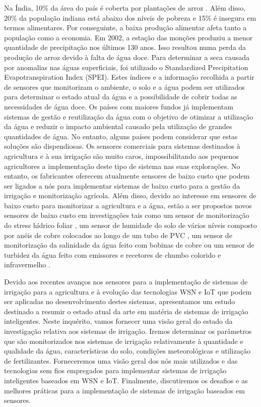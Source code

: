 \documentclass[conference]{IEEEtran}
\begin{document}
Na Índia, 10\% da área do país é coberta por plantações de arroz \cite{zampieri2018surface}. 
Além disso, 20\% da população indiana está 
abaixo dos níveis de pobreza e 15\% é insegura em termos alimentares. 
Por conseguinte, a baixa produção alimentar afeta tanto a população como a economia. 
Em 2002, a estação das monções produziu a menor quantidade de precipitação nos 
últimos 130 anos. Isso resultou numa perda da produção de arroz devido à falta 
de água doce. Para determinar a seca causada por anomalias nas águas superficiais, 
foi utilizado o Standardized Precipitation Evapotranspiration Index (SPEI). 
Estes índices e a informação recolhida a partir de sensores que monitorizam o ambiente, 
o solo e a água podem ser utilizados para determinar o estado atual da água e a 
possibilidade de cobrir todas as necessidades de água doce. Os países com maiores 
fundos já implementam sistemas de gestão e reutilização da água com o objetivo de 
otimizar a utilização da água e reduzir o impacto ambiental causado pela utilização 
de grandes quantidades de água. No entanto, alguns países podem considerar que estas 
soluções são dispendiosas. 
Os sensores comerciais para sistemas destinados à agricultura e à sua irrigação 
são muito caros, impossibilitando aos pequenos agricultores a implementação deste 
tipo de sistema nas suas explorações. No entanto, os fabricantes oferecem atualmente 
sensores de baixo custo que podem ser ligados a nós para implementar sistemas de baixo 
custo para a gestão da irrigação e monitorização agrícola. Além disso, devido ao interesse 
em sensores de baixo custo para monitorizar a agricultura e a água, estão a ser propostos 
novos sensores de baixo custo em investigações tais como um sensor de monitorização do 
stress hídrico foliar \cite{daskalakis2018}, um sensor de humidade do solo de vários níveis composto 
por anéis de cobre colocados ao longo de um tubo de PVC \cite{guruprasadh2017intelligent}, 
um sensor de monitorização da salinidade da água feito com bobinas de 
cobre \cite{parra2013low} ou um sensor de turbidez da água 
feito com emissores e recetores de chumbo colorido e infravermelho \cite{sendra2013low}.

Devido aos recentes avanços nos sensores para a implementação de sistemas de 
irrigação para a agricultura e à evolução das tecnologias WSN e IoT que podem ser 
aplicadas no desenvolvimento destes sistemas, apresentamos um estudo destinado a resumir 
o estado atual da arte em matéria de sistemas de irrigação inteligentes. Neste inquérito, 
vamos fornecer uma visão geral do estado da investigação relativa aos sistemas de irrigação. 
Iremos determinar os parâmetros que são monitorizados nos sistemas de irrigação 
relativamente à quantidade e qualidade da água, características do solo, condições 
meteorológicas e utilização de fertilizantes. Forneceremos uma visão geral dos nós mais 
utilizados e das tecnologias sem fios empregados para implementar sistemas de irrigação 
inteligentes baseados em WSN e IoT. Finalmente, discutiremos os desafios e as melhores 
práticas para a implementação de sistemas de irrigação baseados em sensores.
\end{document}
